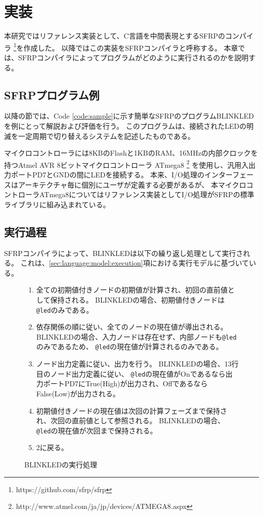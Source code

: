 \chapter{実装}
本研究ではリファレンス実装として、C言語を中間表現とするSFRPのコンパイラ
\footnote{https://github.com/sfrp/sfrp}を作成した。
以降ではこの実装をSFRPコンパイラと呼称する。
本章では、SFRPコンパイラによってプログラムがどのように実行されるのかを説明する。

\section{SFRPプログラム例}
以降の節では、Code \ref{code:sample}に示す簡単なSFRPのプログラムBLINKLEDを例にとって解説および評価を行う。
このプログラムは、接続されたLEDの明滅を一定周期で切り替えるシステムを記述したものである。

マイクロコントローラには8KBのFlashと1KBのRAM、16MHzの内部クロックを持つAtmel AVR 8ビットマイクロコントローラ ATmega8
\footnote{http://www.atmel.com/ja/jp/devices/ATMEGA8.aspx}
を使用し、汎用入出力ポートPD7とGNDの間にLEDを接続する。
本来、I/O処理のインターフェースはアーキテクチャ毎に個別にユーザが定義する必要があるが、
本マイクロコントローラATmega8についてはリファレンス実装としてI/O処理がSFRPの標準ライブラリに組み込まれている。

\newpage



\section{実行過程}
SFRPコンパイラによって、BLINKLEDは以下の繰り返し処理として実行される。
これは、\ref{sec:language:model:execution}項における実行モデルに基づいている。
\begin{figure}[h]
\begin{screen}
\begin{enumerate}
  \item 全ての初期値付きノードの初期値が計算され、初回の直前値として保持される。
    BLINKLEDの場合、初期値付きノードは\texttt{@led}のみである。
  \item 依存関係の順に従い、全てのノードの現在値が導出される。
    BLINKLEDの場合、入力ノードは存在せず、内部ノードも\texttt{@led}のみであるため、
    \texttt{@led}の現在値が計算されるのみである。
  \item ノード出力定義に従い、出力を行う。
    BLINKLEDの場合、13行目のノード出力定義に従い、
    \texttt{@led}の現在値がOnであるなら出力ポートPD7にTrue(High)が出力され、OffであるならFalse(Low)が出力される。
  \item 初期値付きノードの現在値は次回の計算フェーズまで保持され、次回の直前値として参照される。
    BLINKLEDの場合、\texttt{@led}の現在値が次回まで保持される。
  \item 2に戻る。
\end{enumerate}
\end{screen}
\caption{BLINKLEDの実行処理}
\label{fig:exec}
\end{figure}

